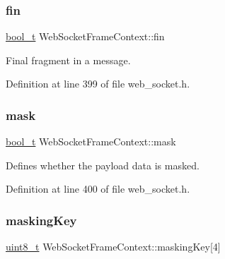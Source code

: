\mbox{\label{structWebSocketFrameContext_a0ac654d7668a4269ca136460a5361b50}} 
\subsubsection{\texorpdfstring{fin}{fin}}
{\footnotesize\ttfamily \hyperlink{compiler__port_8h_a812d16e5494522586b3784e55d479912}{bool\+\_\+t} Web\+Socket\+Frame\+Context\+::fin}



Final fragment in a message. 



Definition at line 399 of file web\+\_\+socket.\+h.

\mbox{\label{structWebSocketFrameContext_a98aeed86b6916fbcf5aa32f7439066e0}} 
\subsubsection{\texorpdfstring{mask}{mask}}
{\footnotesize\ttfamily \hyperlink{compiler__port_8h_a812d16e5494522586b3784e55d479912}{bool\+\_\+t} Web\+Socket\+Frame\+Context\+::mask}



Defines whether the payload data is masked. 



Definition at line 400 of file web\+\_\+socket.\+h.

\mbox{\label{structWebSocketFrameContext_aed0e3efec712dcb1c747dad97187d0ad}} 
\subsubsection{\texorpdfstring{masking\+Key}{maskingKey}}
{\footnotesize\ttfamily \hyperlink{stdint_8h_aba7bc1797add20fe3efdf37ced1182c5}{uint8\+\_\+t} Web\+Socket\+Frame\+Context\+::masking\+Key\mbox{[}4\mbox{]}}




